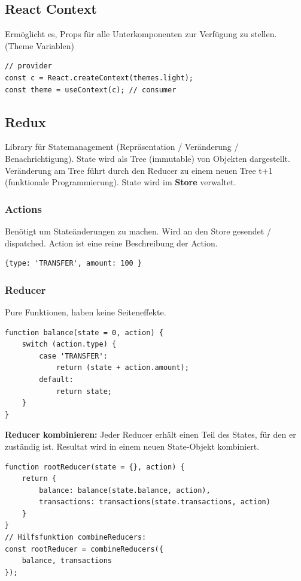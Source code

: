 \subsection{React Context}
Ermöglicht es, Props für alle Unterkomponenten zur Verfügung zu stellen. (Theme Variablen)
\begin{lstlisting}
// provider
const c = React.createContext(themes.light);
const theme = useContext(c); // consumer
\end{lstlisting}

\subsection{Redux}
Library für Statemanagement (Repräsentation / Veränderung / Benachrichtigung).
State wird als Tree (immutable) von Objekten dargestellt.
Veränderung am Tree führt durch den Reducer zu einem neuen Tree t+1 (funktionale Programmierung).
State wird im \textbf{Store} verwaltet.

\subsubsection{Actions}
Benötigt um Stateänderungen zu machen.
Wird an den Store gesendet / dispatched.
Action ist eine reine Beschreibung der Action.
\begin{lstlisting}
{type: 'TRANSFER', amount: 100 }
\end{lstlisting}

\subsubsection{Reducer}
Pure Funktionen, haben keine Seiteneffekte.
\begin{lstlisting}
function balance(state = 0, action) {
    switch (action.type) {
        case 'TRANSFER':
            return (state + action.amount);
        default:
            return state;
    }
}
\end{lstlisting}
\textbf{Reducer kombinieren:} Jeder Reducer erhält einen Teil des States, für den er zuständig ist.
Resultat wird in einem neuen State-Objekt kombiniert.
\begin{lstlisting}
function rootReducer(state = {}, action) {
    return {
        balance: balance(state.balance, action),
        transactions: transactions(state.transactions, action)
    }
}
// Hilfsfunktion combineReducers:
const rootReducer = combineReducers({
    balance, transactions
});
\end{lstlisting}

